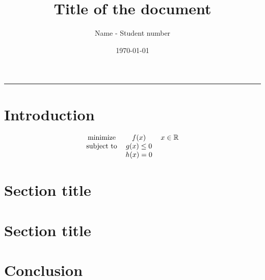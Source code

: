 \documentclass[twocolumn, fontsize=10pt]{article}
\title{
\Large Title of the document  \\
[10pt] 
}
\date{\today}
\author{Name - Student number}
\makeatletter
\renewenvironment{abstract} %
 {\small
  \begin{center}
  \bfseries \abstractname\vspace{-.5em}\vspace{0pt}
  \end{center}
  \list{}{%
    \setlength{\leftmargin}{0mm}
    \setlength{\rightmargin}{\leftmargin}%
  }
  \item\relax}
 {\endlist}
\renewcommand{\maketitle}{\bgroup\setlength{\parindent}{0pt} %
\begin{flushleft}
  \textbf{\@title}
  \@author \\ 
  \@date
\end{flushleft}\egroup
}
\makeatother
\begin{document}
\twocolumn[ \maketitle ]

\begin{abstract}
    \lipsum[1]
\end{abstract}

\rule{\linewidth}{0.5pt}




\section{Introduction}
 \lipsum[2]
\begin{equation}  %
      \begin{tabular}{c c c}
           minimize & $f(x)$ & $x \in \mathbb{R} $\\
           subject to & $g(x)\leq 0 $&  \\
           & $h(x) = 0$& \\
      \end{tabular}
  \end{equation}
\lipsum[1]

\section{Section title}
\lipsum[1-2]
\lipsum[1]

\section{Section title}
\lipsum[1-2]

\section{Conclusion}
\lipsum [4-5]




 
\end{document}
